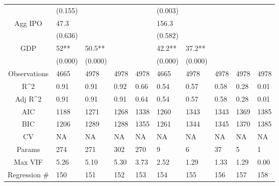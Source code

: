 \documentclass{article}
\begin{document}
\begin{table}[H]
\begin{tabular}{|clllllllll|}
   & (0.155) &  &  &  & (0.003) &  &  &  &  \\ 
  Agg IPO & 47.3 &  &  &  & 156.3 &  &  &  &  \\ 
   & (0.636) &  &  &  & (0.582) &  &  &  &  \\ 
  GDP & 52** & 50.5** &  &  & 42.2** & 37.2** &  &  &  \\ 
   & (0.000) & (0.000) &  &  & (0.000) & (0.000) &  &  &  \\ 
  \hline 
 Observations & 4665 & 4978 & 4978 & 4978 & 4665 & 4978 & 4978 & 4978 & 4978 \\ 
  R^2 & 0.91 & 0.91 & 0.92 & 0.66 & 0.54 & 0.57 & 0.58 & 0.28 & 0.01 \\ 
  Adj R^2 & 0.91 & 0.91 & 0.91 & 0.64 & 0.54 & 0.57 & 0.58 & 0.28 & 0.01 \\ 
  AIC & 1188 & 1271 & 1268 & 1338 & 1260 & 1343 & 1343 & 1369 & 1385 \\ 
  BIC & 1206 & 1289 & 1288 & 1355 & 1261 & 1344 & 1345 & 1370 & 1385 \\ 
  CV & NA & NA & NA & NA & NA & NA & NA & NA & NA \\ 
  Params & 274 & 271 & 302 & 270 & 9 & 6 & 37 & 5 & 1 \\ 
  Max VIF & 5.26 & 5.10 & 5.30 & 3.73 & 2.52 & 1.29 & 1.33 & 1.29 & 0.00 \\ 
  Regression \# & 150 & 151 & 152 & 153 & 154 & 155 & 156 & 157 & 158 \\ 
   \hline
\end{tabular}
 
\end{table}
\end{document}

